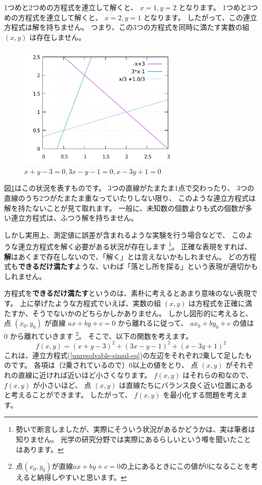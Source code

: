 \documentclass[uplatex,dvipdfmx]{jsarticle}
\begin{document}
  1つめと2つめの方程式を連立して解くと、 $x=1, y=2$ となります。
  1つめと3つめの方程式を連立して解くと、 $x=2, y=1$ となります。
  したがって、この連立方程式は解を持ちません。
  つまり、この3つの方程式を同時に満たす実数の組 $(x, y)$ は存在しません。

  \begin{figure}
    \centering
    \includegraphics[width=8cm]{simul2.png}
    \caption{$x + y - 3 = 0, 3x - y - 1 = 0, x - 3y + 1 = 0$}
    \label{simul2}
  \end{figure}

  図\ref{simul2}はこの状況を表すものです。
  3つの直線がたまたま1点で交わったり、
  3つの直線のうち2つがたまたま重なっていたりしない限り、
  このような連立方程式は解を持たないことが見て取れます。
  一般に、未知数の個数よりも式の個数が多い連立方程式は、ふつう解を持ちません。

  しかし実用上、測定値に誤差が含まれるような実験を行う場合などで、
  このような連立方程式を解く必要がある状況が存在します
  \footnote{
    勢いで断言しましたが、実際にそういう状況があるかどうかは、実は筆者は知りません。
    光学の研究分野では実際にあるらしいという噂を聞いたことはあります。
  }。
  正確な表現をすれば、\textbf{解}はあくまで存在しないので、「解く」とは言えないかもしれません。
  どの方程式も\textbf{できるだけ満たす}ような、いわば「落とし所を探る」という表現が適切かもしれません。

  方程式を\textbf{できるだけ満たす}というのは、素朴に考えるとあまり意味のない表現です。
  上に挙げたような方程式でいえば、実数の組 $(x,y)$ は方程式を正確に満たすか、そうでないかのどちらかしかありません。
  しかし図形的に考えると、点 $(x_0,y_0)$ が直線 $ax +by +c = 0$ から離れるに従って、
  $ax_0 +by_0 +c$ の値は $0$ から離れていきます
  \footnote{
    点$(x_0,y_0)$が直線$ax+by+c=0$の上にあるときにこの値が0になることを考えると納得しやすいと思います。
  }。
  そこで、以下の関数を考えます。
  \begin{equation}
    \label{square-sum-of-simul-eq}
    f(x,y) = (x+y-3)^2 + (3x-y-1)^2 + (x-3y+1)^2
  \end{equation}
  これは、連立方程式(\ref{unresolvable-simul-eq})の左辺をそれぞれ2乗して足したものです。
  各項は（2乗されているので）$0$以上の値をとり、
  点 $(x,y)$ がそれぞれの直線に近ければ近いほど小さくなります。
  $f(x,y)$ はそれらの和なので、 $f(x,y)$ が小さいほど、
  点 $(x,y)$ は直線たちにバランス良く近い位置にあると考えることができます。
  したがって、 $f(x,y)$ を最小化する問題を考えます。
  
\end{document}
